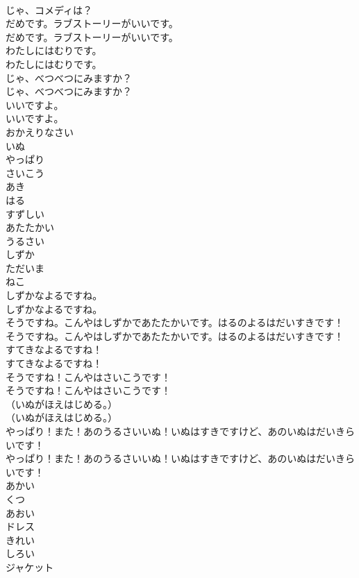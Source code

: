 \documentclass[8pt]{extreport}
\begin{document}
\begin{CJK}{UTF8}{min}
\\	じゃ、コメディは？ 
\\	だめです。ラブストーリーがいいです。	
\\	だめです。ラブストーリーがいいです。 
\\	わたしにはむりです。	
\\	わたしにはむりです。 
\\	じゃ、べつべつにみますか？	
\\	じゃ、べつべつにみますか？ 
\\	いいですよ。	
\\	いいですよ。 
\\	おかえりなさい
\\	いぬ
\\	やっぱり
\\	さいこう
\\	あき
\\	はる
\\	すずしい
\\	あたたかい
\\	うるさい
\\	しずか
\\	ただいま
\\	ねこ
\\	しずかなよるですね。	
\\	しずかなよるですね。 
\\	そうですね。こんやはしずかであたたかいです。はるのよるはだいすきです！	
\\	そうですね。こんやはしずかであたたかいです。はるのよるはだいすきです！ 
\\	すてきなよるですね！	
\\	すてきなよるですね！ 
\\	そうですね！こんやはさいこうです！	
\\	そうですね！こんやはさいこうです！ 
\\	（いぬがほえはじめる。）	
\\	（いぬがほえはじめる。） 
\\	やっぱり！また！あのうるさいいぬ！いぬはすきですけど、あのいぬはだいきらいです！	
\\	やっぱり！また！あのうるさいいぬ！いぬはすきですけど、あのいぬはだいきらいです！ 
\\	あかい
\\	くつ
\\	あおい
\\	ドレス
\\	きれい
\\	しろい
\\	ジャケット

\end{CJK}
\end{document}
